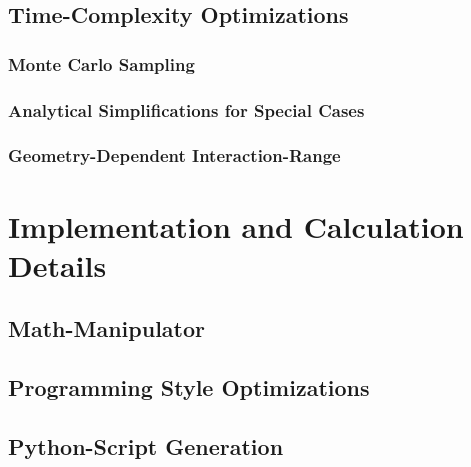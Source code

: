 \documentclass[
headings=optiontohead,              %
12pt,                               %
DIV=13,                             %
twoside=false,                      %
open=right,                         %
BCOR=00mm,                          %
toc=bibliographynumbered            %
]{scrreport}
\begin{document}
    \section{Time-Complexity Optimizations}
    \label{sec:theory-optimizations}
    
    \FloatBarrier

        \subsection{Monte Carlo Sampling}
        \label{sec:theory-optimizations-monte-carlo}
        
        \FloatBarrier

        \subsection{Analytical Simplifications for Special Cases}
        \label{sec:theory-optimizations-analytical}
        
        \FloatBarrier

        \subsection{Geometry-Dependent Interaction-Range}
        \label{sec:theory-optimizations-geometry}
        
        \FloatBarrier
        

\chapter{Implementation and Calculation Details}
\label{sec:implementation-details}

\FloatBarrier

    \section{Math-Manipulator}
    \cite{compilersDragonBook}

    \section{Programming Style Optimizations}

    \section{Python-Script Generation}
\end{document}
